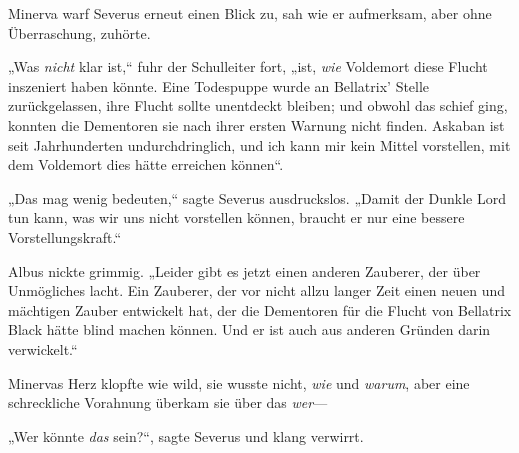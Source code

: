 Minerva warf Severus erneut einen Blick zu, sah wie er aufmerksam, aber ohne Überraschung, zuhörte.

„Was \emph{nicht} klar ist,“ fuhr der Schulleiter fort, „ist, \emph{wie} Voldemort diese Flucht inszeniert haben könnte. Eine Todespuppe wurde an Bellatrix' Stelle zurückgelassen, ihre Flucht sollte unentdeckt bleiben; und obwohl das schief ging, konnten die Dementoren sie nach ihrer ersten Warnung nicht finden. Askaban ist seit Jahrhunderten undurchdringlich, und ich kann mir kein Mittel vorstellen, mit dem Voldemort dies hätte erreichen können“.

„Das mag wenig bedeuten,“ sagte Severus ausdruckslos. „Damit der Dunkle Lord tun kann, was wir uns nicht vorstellen können, braucht er nur eine bessere Vorstellungskraft.“

Albus nickte grimmig. „Leider gibt es jetzt einen anderen Zauberer, der über Unmögliches lacht. Ein Zauberer, der vor nicht allzu langer Zeit einen neuen und mächtigen Zauber entwickelt hat, der die Dementoren für die Flucht von Bellatrix Black hätte blind machen können. Und er ist auch aus anderen Gründen darin verwickelt.“

Minervas Herz klopfte wie wild, sie wusste nicht, \emph{wie} und \emph{warum}, aber eine schreckliche Vorahnung überkam sie über das \emph{wer}—

„Wer könnte \emph{das} sein?“, sagte Severus und klang verwirrt.

